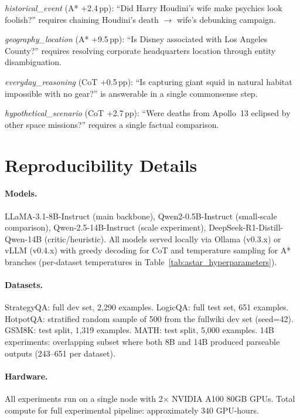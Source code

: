\documentclass{article}
\begin{document}
\emph{historical\_event} (A* +2.4\,pp): ``Did Harry Houdini's wife make psychics look foolish?'' requires chaining Houdini's death $\to$ wife's debunking campaign.

\emph{geography\_location} (A* +9.5\,pp): ``Is Disney associated with Los Angeles County?'' requires resolving corporate headquarters location through entity disambiguation.

\emph{everyday\_reasoning} (CoT +0.5\,pp): ``Is capturing giant squid in natural habitat impossible with no gear?'' is answerable in a single commonsense step.

\emph{hypothetical\_scenario} (CoT +2.7\,pp): ``Were deaths from Apollo~13 eclipsed by other space missions?'' requires a single factual comparison.

\section{Reproducibility Details}
\label{app:reproducibility}

\paragraph{Models.} LLaMA-3.1-8B-Instruct (main backbone), Qwen2-0.5B-Instruct (small-scale comparison), Qwen-2.5-14B-Instruct (scale experiment), DeepSeek-R1-Distill-Qwen-14B (critic/heuristic). All models served locally via Ollama (v0.3.x) or vLLM (v0.4.x) with greedy decoding for CoT and temperature sampling for A* branches (per-dataset temperatures in Table~\ref{tab:astar_hyperparameters}).

\paragraph{Datasets.} StrategyQA: full dev set, 2{,}290 examples. LogicQA: full test set, 651 examples. HotpotQA: stratified random sample of 500 from the fullwiki dev set (seed=42). GSM8K: test split, 1{,}319 examples. MATH: test split, 5{,}000 examples. 14B experiments: overlapping subset where both 8B and 14B produced parseable outputs (243--651 per dataset).

\paragraph{Hardware.} All experiments run on a single node with 2$\times$ NVIDIA A100 80GB GPUs. Total compute for full experimental pipeline: approximately 340 GPU-hours.
\end{document}
